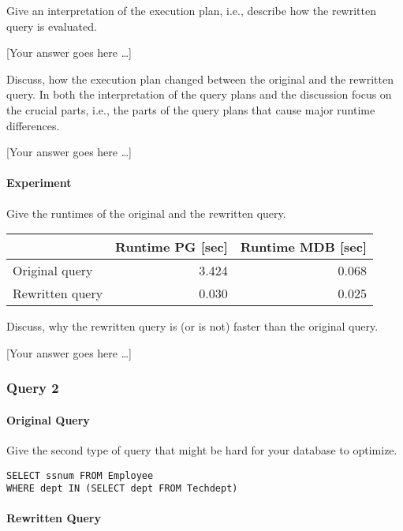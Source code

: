 \documentclass[11pt]{scrartcl}
\newcommand{\youranswerhere}{[Your answer goes here \ldots]}
\begin{document}
    Give an interpretation of the execution plan, i.e., describe how the rewritten query is evaluated.

    \youranswerhere{}

    Discuss, how the execution plan changed between the original and the rewritten query. In both the interpretation of the query plans and the discussion focus on the crucial parts, i.e., the parts of the query plans that cause major runtime differences.

    \youranswerhere{}

    \paragraph{Experiment}

    Give the runtimes of the original and the rewritten query.

    \begin{table}[H]
        \centering
        \begin{tabular}{l|r|r}
            & Runtime PG [sec] & Runtime MDB [sec] \tabularnewline
            \hline
            Original query & 3.424 & 0.068 \tabularnewline
            Rewritten query & 0.030 & 0.025 \tabularnewline
        \end{tabular}
    \end{table}

    Discuss, why the rewritten query is (or is not) faster than the original query.

    \youranswerhere{}

    \subsubsection*{Query 2}

    \paragraph{Original Query}

    Give the second type of query that might be hard for your database to optimize.

    \begin{lstlisting}[style=dbtsql]
SELECT ssnum FROM Employee
WHERE dept IN (SELECT dept FROM Techdept)
    \end{lstlisting}

    \paragraph{Rewritten Query}
\end{document}
